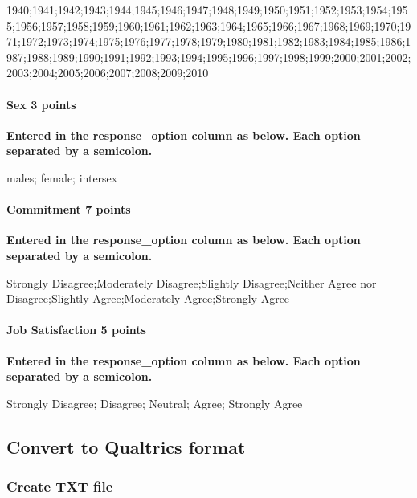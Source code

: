 \documentclass[
]{krantz}
\begin{document}
1940;1941;1942;1943;1944;1945;1946;1947;1948;1949;1950;1951;1952;1953;1954;1955;1956;1957;1958;1959;1960;1961;1962;1963;1964;1965;1966;1967;1968;1969;1970;1971;1972;1973;1974;1975;1976;1977;1978;1979;1980;1981;1982;1983;1984;1985;1986;1987;1988;1989;1990;1991;1992;1993;1994;1995;1996;1997;1998;1999;2000;2001;2002;2003;2004;2005;2006;2007;2008;2009;2010

\hypertarget{sex-3-points}{%
\paragraph{Sex 3 points}\label{sex-3-points}}

\textbf{Entered in the response\_option column as below. Each option separated by a semicolon.}

males; female; intersex

\hypertarget{commitment-7-points}{%
\paragraph{Commitment 7 points}\label{commitment-7-points}}

\textbf{Entered in the response\_option column as below. Each option separated by a semicolon.}

Strongly Disagree;Moderately Disagree;Slightly Disagree;Neither Agree nor Disagree;Slightly Agree;Moderately Agree;Strongly Agree

\hypertarget{job-satisfaction-5-points}{%
\paragraph{Job Satisfaction 5 points}\label{job-satisfaction-5-points}}

\textbf{Entered in the response\_option column as below. Each option separated by a semicolon.}

Strongly Disagree; Disagree; Neutral; Agree; Strongly Agree

\hypertarget{convert-to-qualtrics-format}{%
\subsection{Convert to Qualtrics format}\label{convert-to-qualtrics-format}}

\hypertarget{create-txt-file}{%
\subsubsection{Create TXT file}\label{create-txt-file}}
\end{document}
